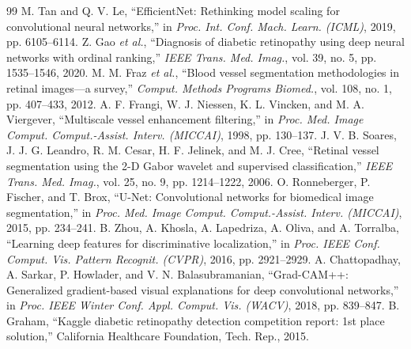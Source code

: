 \documentclass[conference]{IEEEtran}
\begin{document}
\begin{thebibliography}{99}
 M. Tan and Q. V. Le, ``EfficientNet: Rethinking model scaling for convolutional neural networks,'' in \emph{Proc. Int. Conf. Mach. Learn. (ICML)}, 2019, pp. 6105--6114.
 Z. Gao \emph{et al.}, ``Diagnosis of diabetic retinopathy using deep neural networks with ordinal ranking,'' \emph{IEEE Trans. Med. Imag.}, vol. 39, no. 5, pp. 1535--1546, 2020.
 M. M. Fraz \emph{et al.}, ``Blood vessel segmentation methodologies in retinal images---a survey,'' \emph{Comput. Methods Programs Biomed.}, vol. 108, no. 1, pp. 407--433, 2012.
 A. F. Frangi, W. J. Niessen, K. L. Vincken, and M. A. Viergever, ``Multiscale vessel enhancement filtering,'' in \emph{Proc. Med. Image Comput. Comput.-Assist. Interv. (MICCAI)}, 1998, pp. 130--137.
 J. V. B. Soares, J. J. G. Leandro, R. M. Cesar, H. F. Jelinek, and M. J. Cree, ``Retinal vessel segmentation using the 2-D Gabor wavelet and supervised classification,'' \emph{IEEE Trans. Med. Imag.}, vol. 25, no. 9, pp. 1214--1222, 2006.
 O. Ronneberger, P. Fischer, and T. Brox, ``U-Net: Convolutional networks for biomedical image segmentation,'' in \emph{Proc. Med. Image Comput. Comput.-Assist. Interv. (MICCAI)}, 2015, pp. 234--241.
 B. Zhou, A. Khosla, A. Lapedriza, A. Oliva, and A. Torralba, ``Learning deep features for discriminative localization,'' in \emph{Proc. IEEE Conf. Comput. Vis. Pattern Recognit. (CVPR)}, 2016, pp. 2921--2929.
 A. Chattopadhay, A. Sarkar, P. Howlader, and V. N. Balasubramanian, ``Grad-CAM++: Generalized gradient-based visual explanations for deep convolutional networks,'' in \emph{Proc. IEEE Winter Conf. Appl. Comput. Vis. (WACV)}, 2018, pp. 839--847.
 B. Graham, ``Kaggle diabetic retinopathy detection competition report: 1st place solution,'' California Healthcare Foundation, Tech. Rep., 2015.
\end{thebibliography}
\end{document}
